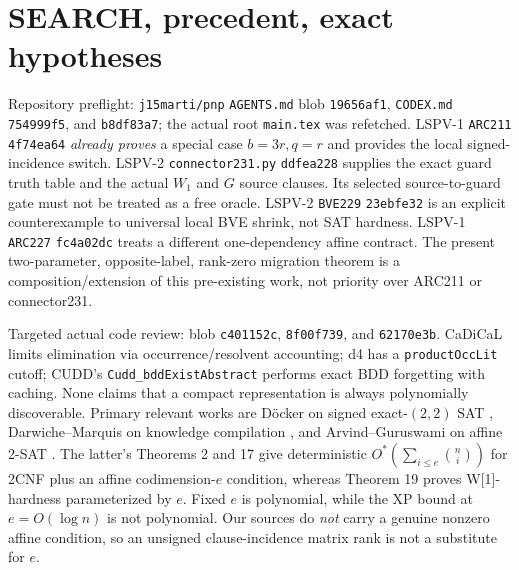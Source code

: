 \documentclass[10pt]{article}
\begin{document}
\section{SEARCH, precedent, exact hypotheses}
\noindent Repository preflight: \texttt{j15marti/pnp} \texttt{AGENTS.md} blob \texttt{19656af1}, \texttt{CODEX.md} \texttt{754999f5}, and  \texttt{b8df83a7}; the actual root \texttt{main.tex} was refetched. LSPV-1 \texttt{ARC211} \texttt{4f74ea64} \emph{already proves} a special case $b=3r,q=r$ and provides the local signed-incidence switch. LSPV-2 \texttt{connector231.py} \texttt{ddfea228} supplies the exact guard truth table and the actual $W_1$ and $G$ source clauses. Its selected source-to-guard gate must not be treated as a free oracle. LSPV-2 \texttt{BVE229} \texttt{23ebfe32} is an explicit counterexample to universal local BVE shrink, not SAT hardness. LSPV-1 \texttt{ARC227} \texttt{fc4a02dc} treats a different one-dependency affine contract. The present two-parameter, opposite-label, rank-zero migration theorem is a composition/extension of this pre-existing work, not priority over ARC211 or connector231.

\noindent Targeted actual code review:  blob \texttt{c401152c},  \texttt{8f00f739}, and  \texttt{62170e3b}. CaDiCaL limits elimination via occurrence/resolvent accounting; d4 has a \texttt{productOccLit} cutoff; CUDD's \texttt{Cudd\_bddExistAbstract} performs exact BDD forgetting with caching. None claims that a compact representation is always polynomially discoverable. Primary relevant works are D\"ocker on signed exact-$(2,2)$ SAT \cite{docker}, Darwiche--Marquis on knowledge compilation \cite{dm}, and Arvind--Guruswami on affine 2-SAT \cite{ag}. The latter's Theorems 2 and 17 give deterministic $O^*(\sum_{i\le e}\binom{n}{i})$ for 2CNF plus an affine codimension-$e$ condition, whereas Theorem 19 proves W[1]-hardness parameterized by $e$. Fixed $e$ is polynomial, while the XP bound at $e=O(\log n)$ is not polynomial. Our sources do \emph{not} carry a genuine nonzero affine condition, so an unsigned clause-incidence matrix rank is not a substitute for $e$.
\end{document}
